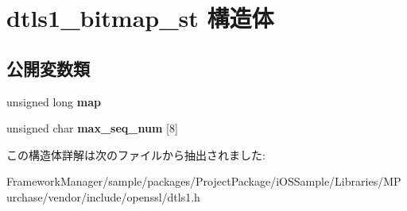 \hypertarget{structdtls1__bitmap__st}{}\section{dtls1\+\_\+bitmap\+\_\+st 構造体}
\label{structdtls1__bitmap__st}
\subsection*{公開変数類}
\begin{DoxyCompactItemize}
\item 
\hypertarget{structdtls1__bitmap__st_a1b23acab32785f0a6780921565166622}{}unsigned long {\bfseries map}\label{structdtls1__bitmap__st_a1b23acab32785f0a6780921565166622}

\item 
\hypertarget{structdtls1__bitmap__st_aab16a8e227150f8bb745ea006b798221}{}unsigned char {\bfseries max\+\_\+seq\+\_\+num} \mbox{[}8\mbox{]}\label{structdtls1__bitmap__st_aab16a8e227150f8bb745ea006b798221}

\end{DoxyCompactItemize}


この構造体詳解は次のファイルから抽出されました\+:\begin{DoxyCompactItemize}
\item 
Framework\+Manager/sample/packages/\+Project\+Package/i\+O\+S\+Sample/\+Libraries/\+M\+Purchase/vendor/include/openssl/dtls1.\+h\end{DoxyCompactItemize}
